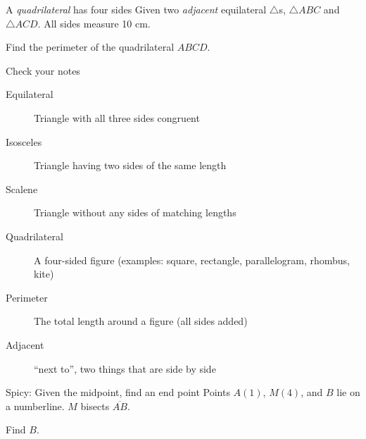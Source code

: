 \begin{frame}{A \emph{quadrilateral} has four sides}
  Given two \emph{adjacent} equilateral $\triangle$s, $\triangle ABC$ and $\triangle ACD$. All sides measure 10 cm. 
  \begin{center}
  \end{center} \bigskip
  Find the perimeter of the quadrilateral $ABCD$. \vspace{3cm}
  \end{frame}

\begin{frame}{Check your notes}
  \begin{description}
    \item[Equilateral] Triangle with all three sides congruent
    \item[Isosceles] Triangle having two sides of the same length
    \item[Scalene] Triangle without any sides of matching lengths
    \item[Quadrilateral] A four-sided figure (examples: square, rectangle, parallelogram, rhombus, kite)
    \item[Perimeter] The total length around a figure (all sides added)
    \item[Adjacent] ``next to'', two things that are side by side
  \end{description}
\end{frame}

\begin{frame}{Spicy: Given the midpoint, find an end point}
  Points $A(1)$, $M(4)$, and $B$ lie on a numberline. $M$ bisects $\overline{AB}$. \par \medskip
  Find $B$.
  \begin{center}
  \end{center}\vspace{2cm}
\end{frame}

